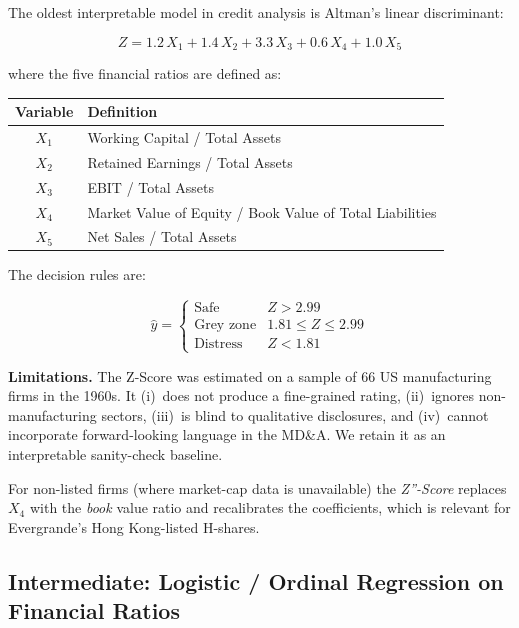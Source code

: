 \documentclass[12pt, a4paper]{article}
\begin{document}
The oldest interpretable model in credit analysis is Altman's linear discriminant:

\begin{equation}
  Z = 1.2\,X_1 + 1.4\,X_2 + 3.3\,X_3 + 0.6\,X_4 + 1.0\,X_5
  \label{eq:altman}
\end{equation}

where the five financial ratios are defined as:

\begin{center}
\begin{tabularx}{0.9\linewidth}{c X}
  \toprule
  \textbf{Variable} & \textbf{Definition} \\
  \midrule
  $X_1$ & Working Capital / Total Assets \\
  $X_2$ & Retained Earnings / Total Assets \\
  $X_3$ & EBIT / Total Assets \\
  $X_4$ & Market Value of Equity / Book Value of Total Liabilities \\
  $X_5$ & Net Sales / Total Assets \\
  \bottomrule
\end{tabularx}
\end{center}

The decision rules are:

\begin{equation}
  \hat{y} = \begin{cases}
    \text{Safe}        & Z > 2.99 \\
    \text{Grey zone}   & 1.81 \leq Z \leq 2.99 \\
    \text{Distress}    & Z < 1.81
  \end{cases}
\end{equation}

\noindent\textbf{Limitations.}  The Z-Score was estimated on a sample of 66 US manufacturing firms in the 1960s.  It (i)~does not produce a fine-grained rating, (ii)~ignores non-manufacturing sectors, (iii)~is blind to qualitative disclosures, and (iv)~cannot incorporate forward-looking language in the MD\&A.  We retain it as an interpretable sanity-check baseline.

For non-listed firms (where market-cap data is unavailable) the \emph{Z''-Score} replaces $X_4$ with the \emph{book} value ratio and recalibrates the coefficients, which is relevant for Evergrande's Hong Kong-listed H-shares.

\subsection{Intermediate: Logistic / Ordinal Regression on Financial Ratios}
\label{sec:logistic}
\end{document}
